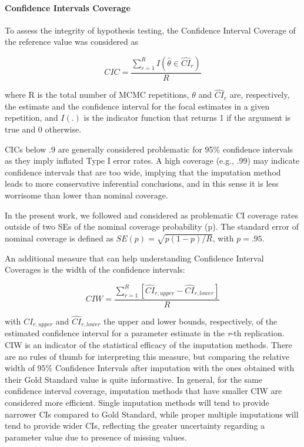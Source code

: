 	\paragraph{Confidence Intervals Coverage}
	To assess the integrity of hypothesis testing, the Confidence Interval Coverage of the reference value
	was considered as

	\begin{equation} \label{eqn:cic}
		CIC =  \frac{ \sum_{r=1}^{R} I(\hat{\theta} \in \widehat{CI}_r ) }{R}
	\end{equation}

	where R is the total number of MCMC repetitions, 
	$\theta$ and $\hat{CI}_r$ are, respectively, the estimate and the confidence interval for the focal estimates 
	in a given repetition, 
	and $I(.)$ is the indicator function that returns 1 if the argument is true and 0 otherwise.

	CICs below .9 are generally considered problematic for 95\% confidence intervals \cite[p. 52]{vanBuuren:2018} 
	as they imply inflated Type I error rates.
	A high coverage (e.g., .99) may indicate confidence intervals that are too wide, implying that
	the imputation method leads to more conservative inferential conclusions, and in this sense it is less worrisome 
	than lower than nominal coverage.

	In the present work, we followed \cite{burtonEtAl:2006} and considered as problematic CI coverage rates
	outside of two SEs of the nominal coverage probability (p).
	The standard error of nominal coverage is defined as $SE(p) = \sqrt{p (1-p)/R}$, with $p = .95$.

	An additional measure that can help understanding Confidence Interval Coverages is the width of the confidence
	intervals:

	\begin{equation} \label{eqn:ciw}
		CIW =  \frac{ \sum_{r=1}^{R} [\widehat{CI}_{r,upper} - \widehat{CI}_{r,lower}] }{R}
	\end{equation}

	with $\widehat{CI}_{r,upper}$ and $\widehat{CI}_{r,lower}$ the upper and lower bounds, respectively, 
	of the estimated confidence interval for a parameter estimate in the \emph{r}-th replication.
	CIW is an indicator of the statistical efficacy of the imputation methods.
	There are no rules of thumb for interpreting this measure, but comparing the relative width of 95\%
	Confidence Intervals after imputation with the ones obtained with their Gold Standard value is quite 
	informative.
	In general, for the same confidence interval coverage, imputation methods that have smaller CIW are
	considered more efficient.
	Single imputation methods will tend to provide narrower CIs compared to Gold Standard, while proper 
	multiple imputations will tend to provide wider CIs, reflecting the greater uncertainty regarding a 
	parameter value due to presence of missing values.

